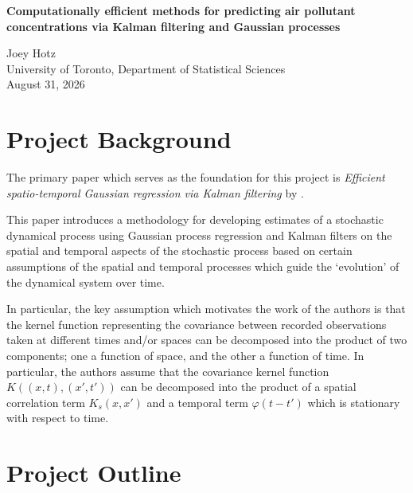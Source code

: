 \documentclass[12pt]{article}
\numberwithin{equation}{section}
\numberwithin{figure}{section}
\numberwithin{table}{section}
\begin{document}
\begin{center}
    {\LARGE{\textbf{Computationally efficient methods for predicting air pollutant concentrations via Kalman filtering and Gaussian processes}}}
    \vspace*{2cm}

    {\Large{Joey Hotz}}\\
    \vspace*{1cm}
    {\large{University of Toronto, Department of Statistical Sciences}}\\
    \vspace*{1cm}
    {\large{August 31, 2026}}

    \vfill

\end{center}
\thispagestyle{empty}
\clearpage

\setcounter{page}{1}

\section{Project Background}\label{sec:background}

The primary paper which serves as the foundation for this project is \emph{Efficient spatio-temporal Gaussian regression via Kalman filtering} by .

This paper introduces a methodology for developing estimates of a stochastic dynamical process using Gaussian process regression and Kalman filters on the spatial and temporal aspects of the stochastic process based on certain assumptions of the spatial and temporal processes which guide the `evolution' of the dynamical system over time. 

In particular, the key assumption which motivates the work of the authors is that the kernel function representing the covariance between recorded observations taken at different times and/or spaces can be decomposed into the product of two components; one a function of space, and the other a function of time. In particular, the authors assume that the covariance kernel function $K((x, t), (x', t'))$ can be decomposed into the product of a spatial correlation term $K_{s}(x, x')$ and a temporal term $\varphi(t - t')$ which is stationary with respect to time.  

\section{Project Outline}\label{sec:outline}
\end{document}
